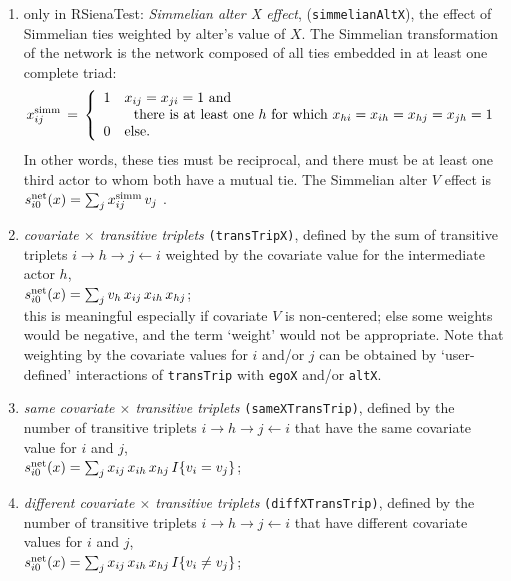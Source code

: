 \documentclass[a4paper,fleqn,11pt]{article}
\newcommand{\+}{\, + \,}
\newcommand{\vit}{\theenumi}
\begin{document}
\begin{enumerate}
\item only in \textsf{RSienaTest}:  \emph{Simmelian alter X effect}, (\texttt{simmelianAltX}), the effect of
      Simmelian ties weighted by alter's value of $X$. The Simmelian transformation of the network is
      the network composed of all ties embedded in at least one complete triad:
\[
    x^{\rm{simm}}_{ij} \,=\, \left\{ \begin{array}{cl}
                               1 & x_{ij} = x_{ji} = 1 \text{ and} \\
                                  & \ \text{ there is at least one }
                                      h \text{ for which } x_{hi} = x_{ih} = x_{hj} = x_{jh} = 1 \\
                               0 & \text{else.}
                             \end{array} \right.
\]
      In other words, these ties must be reciprocal, and there must be at least one
      third actor to whom both have a mutual tie.
      The Simmelian alter $V$ effect  is  \\
$s^{\rm net}_{i\vit}(x ) = \sum_j  x^{\rm{simm}}_{ij}\,v_j $ .


 \item {\em covariate $\times$ transitive triplets}
 \texttt{(transTripX)}, defined by the sum of transitive triplets
 $i \rightarrow h \rightarrow j \leftarrow i$
 weighted by the covariate value for the intermediate actor $h$,\\
 $s^{\rm net}_{i\vit}(x) =
 \sum_j v_h \, x_{ij}\, x_{ih} \, x_{hj} $;\\
 this is meaningful especially if covariate $V$ is non-centered;
 else some weights would be negative, and the term `weight'
 would not be appropriate.
 Note that weighting by the covariate values for $i$ and/or $j$
 can be obtained by `user-defined' interactions of \texttt{transTrip}
 with \texttt{egoX} and/or \texttt{altX}.


 \item {\em same covariate $\times$ transitive triplets}
 \texttt{(sameXTransTrip)}, defined by the number of transitive triplets
 $i \rightarrow h \rightarrow j \leftarrow i$
 that have the same covariate value for $i$ and $j$,\\
 $s^{\rm net}_{i\vit}(x) =
 \sum_j x_{ij}\, x_{ih} \, x_{hj} \, I\{v_i = v_j\}$;

 \item {\em different covariate $\times$ transitive triplets}
 \texttt{(diffXTransTrip)}, defined by the number of transitive triplets
 $i \rightarrow h \rightarrow j \leftarrow i$
 that have different covariate values for $i$ and $j$,\\
 $s^{\rm net}_{i\vit}(x) =
 \sum_j x_{ij}\, x_{ih} \, x_{hj} \, I\{v_i \neq v_j\}$;



\end{enumerate}
\end{document}
